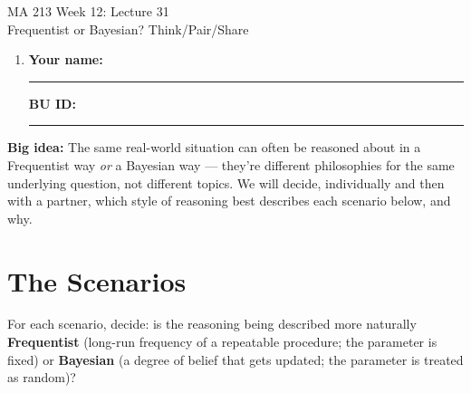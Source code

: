 \documentclass{article}
\newcommand{\coursenumber}{MA 213}
\newcommand{\weekplaceholder}{12}
\newcommand{\lectureplaceholder}{31}
\newcommand{\lecturetitle}{Frequentist or Bayesian? Think/Pair/Share}
\newcommand{\nameblank}{\rule{1.75in}{0.4pt}}
\newcommand{\idblank}{\rule{1.55in}{0.4pt}}
\begin{document}
\begin{center}
  {\LARGE \coursenumber{} Week \weekplaceholder{}: Lecture \lectureplaceholder{}}\\
  {\large \lecturetitle{}}
\end{center}

\begin{enumerate}[label=\arabic*.,leftmargin=*,itemsep=.7em]
  \item \textbf{Your name:} \nameblank \hfill \textbf{BU ID:} \idblank
\end{enumerate}

\textbf{Big idea:} The same real-world situation can often be reasoned about in a Frequentist way \emph{or} a Bayesian way --- they're different philosophies for the same underlying question, not different topics. We will decide, individually and then with a partner, which style of reasoning best describes each scenario below, and why.

\section*{The Scenarios}

For each scenario, decide: is the reasoning being described more naturally \textbf{Frequentist} (long-run frequency of a repeatable procedure; the parameter is fixed) or \textbf{Bayesian} (a degree of belief that gets updated; the parameter is treated as random)?
\end{document}
